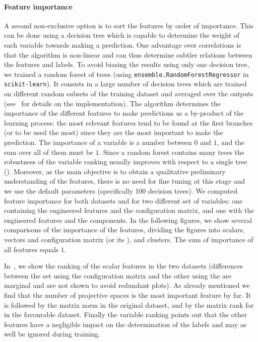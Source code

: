 \paragraph{Feature importance}

A second non-exclusive option is to sort the features by order of importance.
This can be done using a decision tree which is capable to determine the weight of each variable towards making a prediction.
One advantage over correlations is that the algorithm is non-linear and can thus determine subtler relations between the features and labels.
To avoid biasing the results using only one decision tree, we trained a random forest of trees (using \texttt{ensemble.RandomForestRegressor} in \texttt{scikit-learn}).
It consists in a large number of decision trees which are trained on different random subsets of the training dataset and averaged over the outputs (see~ for details on the implementation).
The algorithm determines the importance of the different features to make predictions as a by-product of the learning process: the most relevant features tend to be found at the first branches (or to be used the most) since they are the most important to make the prediction.
The importance of a variable is a number between $0$ and $1$, and the sum over all of them must be $1$.
Since a random forest contains many trees the robustness of the variable ranking usually improves with respect to a single tree ().
Moreover, as the main objective is to obtain a qualitative preliminary understanding of the features, there is no need for fine tuning at this stage and we use the default parameters (specifically \num{100} decision trees).
We computed feature importance for both datasets and for two different set of variables: one containing the engineered features and the configuration matrix, and one with the engineered features and the \pca components.
In the following figures, we show several comparisons of the importance of the features, dividing the figures into scalars, vectors and configuration matrix (or its \pca), and clusters.
The sum of importance of all features equals $1$.

In~, we show the ranking of the scalar features in the two datasets (differences between the set using the configuration matrix and the other using the \pca are marginal and are not shown to avoid redundant plots).
As already mentioned we find that the number of projective spaces is the most important feature by far.
It is followed by the matrix norm in the original dataset, and by the matrix rank for  in the favourable dataset.
Finally the variable ranking points out that the other features have a negligible impact on the determination of the labels and may as well be ignored during training.

